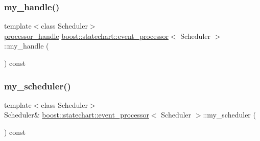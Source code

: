 \subsubsection{\texorpdfstring{my\+\_\+handle()}{my\_handle()}}
{\footnotesize\ttfamily template$<$class Scheduler$>$ \\
\mbox{\hyperlink{classboost_1_1statechart_1_1event__processor_a0cb7488f303c3c79a6bd52b58ce43a2a}{processor\+\_\+handle}} \mbox{\hyperlink{classboost_1_1statechart_1_1event__processor}{boost\+::statechart\+::event\+\_\+processor}}$<$ Scheduler $>$\+::my\+\_\+handle (\begin{DoxyParamCaption}{ }\end{DoxyParamCaption}) const\hspace{0.3cm}{\ttfamily [inline]}}

\mbox{\label{classboost_1_1statechart_1_1event__processor_ac31ddbd5fc37e237911285d65c6d1d82}} 
\subsubsection{\texorpdfstring{my\+\_\+scheduler()}{my\_scheduler()}}
{\footnotesize\ttfamily template$<$class Scheduler$>$ \\
Scheduler\& \mbox{\hyperlink{classboost_1_1statechart_1_1event__processor}{boost\+::statechart\+::event\+\_\+processor}}$<$ Scheduler $>$\+::my\+\_\+scheduler (\begin{DoxyParamCaption}{ }\end{DoxyParamCaption}) const\hspace{0.3cm}{\ttfamily [inline]}}

\mbox{\label{classboost_1_1statechart_1_1event__processor_af25f0f18781032f24b251c1108132f39}} 
